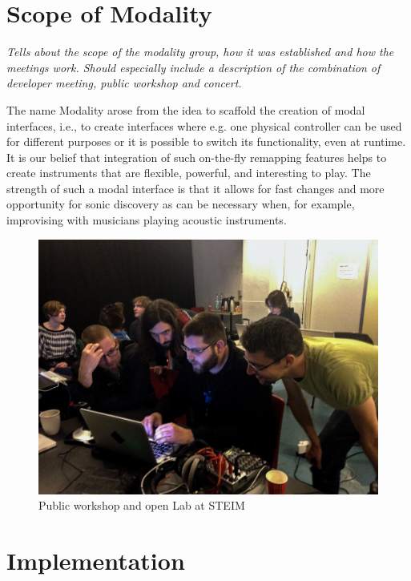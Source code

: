 \documentclass{article}
\begin{document}
\section{Scope of Modality}
\label{sec:scope_of_modality_tech_info_where_what}

\emph{Tells about the scope of the modality group, how it was established and how the meetings work. Should especially include a description of the combination of developer meeting, public workshop and concert.}

The name Modality arose from the idea to scaffold the creation of modal interfaces, i.e., to create interfaces where e.g. one physical controller can be used for different purposes or it is possible to switch its functionality, even at runtime. It is our belief that integration of such on-the-fly remapping features helps to create instruments that are flexible, powerful, and interesting to play. The strength of such a modal interface is that it allows for fast changes and more opportunity for sonic discovery as can be necessary when, for example, improvising with musicians playing acoustic instruments. 


\begin{figure}[h]
	\centering
		\includegraphics[width=.9\columnwidth]{../media/20140403-IMG_1667.jpg}
	\caption{Public workshop and open Lab at STEIM}
	\label{fig:media_20140331-IMG_5976}
\end{figure}



\section{Implementation}
\label{sec:implementation}
\end{document}
